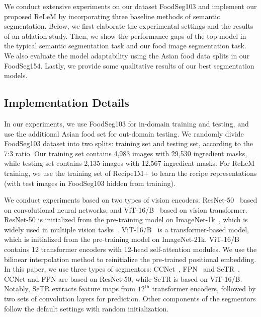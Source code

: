 
We conduct extensive experiments on our dataset FoodSeg103 and implement our proposed ReLeM by incorporating three baseline methods of semantic segmentation. 
Below, we first elaborate the experimental settings and the results of an ablation study.
Then, we show the performance gaps of the top model in the typical semantic segmentation task and our food image segmentation task.
We also evaluate the model adaptability using the Asian food data splits in our FoodSeg154.
Lastly, we provide some qualitative results of our best segmentation models.

\subsection{Implementation Details}
  In our experiments, we use FoodSeg103 for in-domain training and testing, and use the additional Asian food set for out-domain testing. We randomly divide FoodSeg103 dataset into two splits: training set and testing set,  according to the 7:3 ratio. Our training set contains 4,983 images with 29,530 ingredient masks, while testing set contains 2,135 images with 12,567 ingredient masks. For ReLeM training, we use the training set of Recipe1M+ to learn the recipe representations (with test images in FoodSeg103 hidden from training). 

 We conduct experiments based on two types of vision encoders: ResNet-50~\cite{he2016deep} based on convolutional neural networks, and ViT-16/B~\cite{dosovitskiy2021an} based on vision transformer. ResNet-50 is initialized from the pre-training model on ImageNet-1k~\cite{deng2009imagenet}, which is widely used in multiple vision tasks~\cite{krizhevsky2012imagenet,ren2015faster,chen2017deeplab}. ViT-16/B~\cite{dosovitskiy2021an} is a transformer-based model, which is initialized from the pre-training model on ImageNet-21k. ViT-16/B contains 12 transformer encoders with 12-head self-attention modules. We use the bilinear interpolation method to reinitialize the pre-trained positional embedding. In this paper, we use three types of segmentors: CCNet~\cite{huang2018ccnet}, FPN~\cite{kirillov2019panoptic} and SeTR~\cite{SETR}. CCNet and FPN are based on ResNet-50, while SeTR is based on ViT-16/B. 
Notably, SeTR extracts feature maps from $12^{\text{th}}$ transformer encoders, followed by two sets of convolution layers for prediction. Other components of the segmentors follow the default settings with random initialization.

